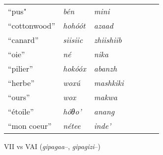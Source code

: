 \documentclass[twoside,a4paper,11pt]{article}
\newcommand{\ipa}[1]{{\phon\textit{#1}}}
\newcommand{\Σ}{\greek{Σ}}
\begin{document}
\begin{table}[h]
\begin{tabular}{lllllll}
``pus" & \ipa{bén} & \ipa{mini} \\
``cottonwood'' &\ipa{hohóót} &\ipa{azaad} \\
``canard'' &\ipa{siisiic} &\ipa{zhiishiib} \\
``oie'' &\ipa{né} &\ipa{nika} \\
``pilier'' &\ipa{hokóóx} &\ipa{abanzh} \\
``herbe'' &\ipa{woxú} &\ipa{mashkiki} \\
``ours'' &\ipa{wox} &\ipa{makwa} \\
``étoile'' &\ipa{hóθo'} &\ipa{anang} \\
``mon coeur'' &\ipa{nétee} &\ipa{inde'} \\
\bottomrule
\end{tabular}
\end{table}
VII vs VAI (\textit{gipagaa}--, \textit{gipagizi}--)

 
 
\end{document}
